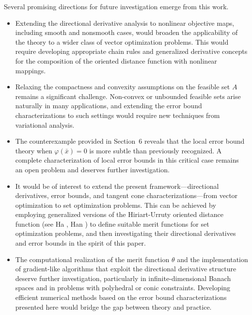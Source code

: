 \documentclass[11pt]{article}
\begin{document}
Several promising directions for future investigation emerge from this work. 

\begin{itemize}
	\item[(i)] Extending the directional derivative analysis to nonlinear objective maps, including smooth and nonsmooth cases, would broaden the applicability of the theory to a wider class of vector optimization problems. This would require developing appropriate chain rules and generalized derivative concepts for the composition of the oriented distance function with nonlinear mappings.
	
	\item[(ii)] Relaxing the compactness and convexity assumptions on the feasible set \(A\) remains a significant challenge. Non-convex or unbounded feasible sets arise naturally in many applications, and extending the error bound characterizations to such settings would require new techniques from variational analysis.
	
	\item[(iii)] The counterexample provided in Section~6 reveals that the local error bound theory when \(\varphi(\bar{x})=0\) is more subtle than previously recognized. A complete characterization of local error bounds in this critical case remains an open problem and deserves further investigation.
	
	\item[(iv)] It would be of interest to extend the present framework—directional derivatives, error bounds, and tangent cone characterizations—from vector optimization to set optimization problems. This can be achieved by employing generalized versions of the Hiriart-Urruty oriented distance function (see Ha \cite{Ha2018}, Han \cite{Han2022}) to define suitable merit functions for set optimization problems, and then investigating their directional derivatives and error bounds in the spirit of this paper.
	
	\item[(v)] The computational realization of the merit function \(\theta\) and the implementation of gradient-like algorithms that exploit the directional derivative structure deserve further investigation, particularly in infinite-dimensional Banach spaces and in problems with polyhedral or conic constraints. Developing efficient numerical methods based on the error bound characterizations presented here would bridge the gap between theory and practice.
	
\end{itemize}
\end{document}
